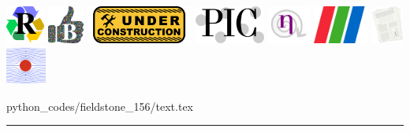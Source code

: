 \noindent
\includegraphics[height=1.25cm]{images/pictograms/replication}
\includegraphics[height=1.25cm]{images/pictograms/benchmark}
\includegraphics[height=1.25cm]{images/pictograms/under_construction}
\includegraphics[height=1.25cm]{images/pictograms/pic}
\includegraphics[height=1.25cm]{images/pictograms/nonlinear}
\includegraphics[height=1.25cm]{images/pictograms/paraview}
\includegraphics[height=1.25cm]{images/pictograms/publication}
\includegraphics[height=1.25cm]{images/pictograms/streamfunction}



\begin{flushright} {\tiny {\color{gray} python\_codes/fieldstone\_156/text.tex}} \end{flushright}

%

\par\noindent\rule{\textwidth}{0.4pt}

